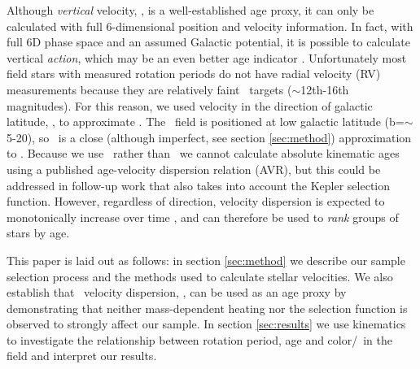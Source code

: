 Although {\it vertical} velocity, \vz, is a well-established age proxy, it can
only be calculated with full 6-dimensional position and velocity information.
In fact, with full 6D phase space and an assumed Galactic potential, it is
possible to calculate vertical {\it action}, which may be an even better age
indicator \citep{beane2018, ting2019}.
Unfortunately most field stars with measured rotation periods do not have
radial velocity (RV) measurements because they are relatively faint \kepler\
targets ($\sim$12th-16th magnitudes).
For this reason, we used velocity in the direction of galactic latitude, \vb,
to approximate \vz.
The \kepler\ field is positioned at low galactic latitude
(b=$\sim$5-20\degrees), so \vb\ is a close (although imperfect, see section
\ref{sec:method}) approximation to \vz.
Because we use \vb\ rather than \vz\, we cannot calculate absolute kinematic
ages using a published age-velocity dispersion relation (AVR), but this could
be addressed in follow-up work that also takes into account the Kepler
selection function.
However, regardless of direction, velocity dispersion is expected to
monotonically increase over time \citep[\eg][]{holmberg2009}, and can
therefore be used to {\it rank} groups of stars by age.

This paper is laid out as follows: in section \ref{sec:method} we describe our
sample selection process and the methods used to calculate stellar
velocities.
We also establish that \vb\ velocity dispersion, \sigmavb, can be used as an
age proxy by demonstrating that neither mass-dependent heating nor the
selection function is observed to strongly affect our sample.
In section \ref{sec:results} we use kinematics to investigate the
relationship between rotation period, age and color/\teff\ in the field and
interpret our results.

